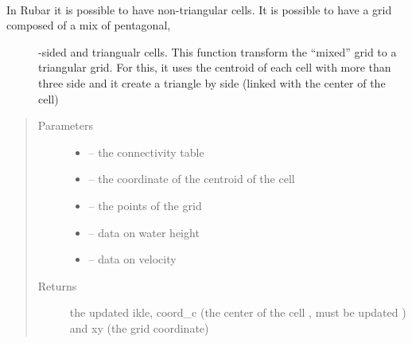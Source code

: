 \documentclass[letterpaper,10pt,english]{sphinxmanual}
\begin{document}
\begin{fulllineitems}
\label{\detokenize{index:src.rubar.get_triangular_grid}}~\begin{description}
\item[{In Rubar it is possible to have non-triangular cells. It is possible to have a grid composed of a mix of pentagonal,}] -sided and triangualr cells. This function transform the ``mixed'' grid to a triangular grid. For this, it uses the
centroid of each cell with more than three side and it create a triangle by side (linked with the center of the cell)

\end{description}
\begin{quote}\begin{description}
\item[{Parameters}] \leavevmode\begin{itemize}
\item {} 
 -- the connectivity table

\item {} 
 -- the coordinate of the centroid of the cell

\item {} 
 -- the points of the grid

\item {} 
 -- data on water height

\item {} 
 -- data on velocity

\end{itemize}

\item[{Returns}] \leavevmode
the updated ikle, coord\_c (the center of the cell , must be updated ) and xy (the grid coordinate)

\end{description}\end{quote}

\end{fulllineitems}

\end{document}
